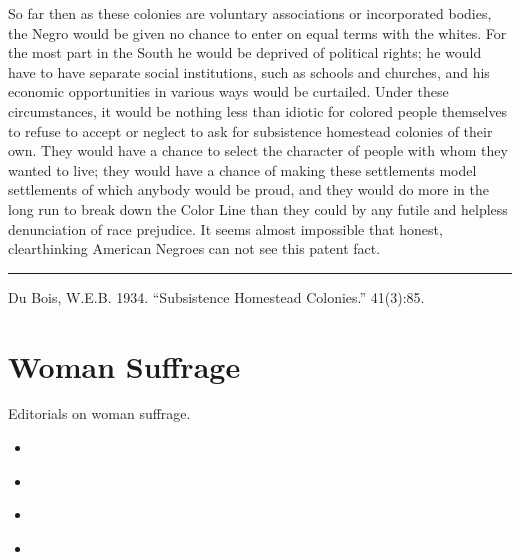\documentclass[letterpaper,10pt,english]{jupyterBook}
\begin{document}
\sphinxAtStartPar
So far then as these colonies are voluntary associations or incorporated bodies, the Negro would be given no chance to enter on equal terms with the whites. For the most part in the South he would be deprived of political rights; he would have to have separate social institutions, such as schools and churches, and his economic opportunities in various ways would be curtailed. Under these circumstances, it would be nothing less than idiotic for colored people themselves to refuse to accept or neglect to ask for subsistence homestead colonies of their own. They would have a chance to select the character of people with whom they wanted to live; they would have a chance of making these settlements model settlements of which anybody would be proud, and they would do more in the long run to break down the Color Line than they could by any futile and helpless denunciation of race prejudice. It seems almost impossible that honest, clear\sphinxhyphen{}thinking American Negroes can not see this patent fact.


\bigskip\hrule\bigskip


\sphinxAtStartPar
{} Du Bois, W.E.B. 1934. “Subsistence Homestead Colonies.” 41(3):85.


\chapter{Woman Suffrage}
\label{\detokenize{Sections/womansuffrage:woman-suffrage}}\label{\detokenize{Sections/womansuffrage::doc}}
\sphinxAtStartPar
Editorials on woman suffrage.
\begin{itemize}
\item {} 
\sphinxAtStartPar
{\hyperref[\detokenize{Volumes/04/04/ohio::doc}]{}}

\item {} 
\sphinxAtStartPar
{\hyperref[\detokenize{Volumes/09/06/womansuffrage::doc}]{}}

\item {} 
\sphinxAtStartPar
{\hyperref[\detokenize{Volumes/09/03/agility::doc}]{}}

\item {} 
\sphinxAtStartPar
{\hyperref[\detokenize{Volumes/15/01/votes_for_women::doc}]{}}

\end{itemize}
\end{document}
